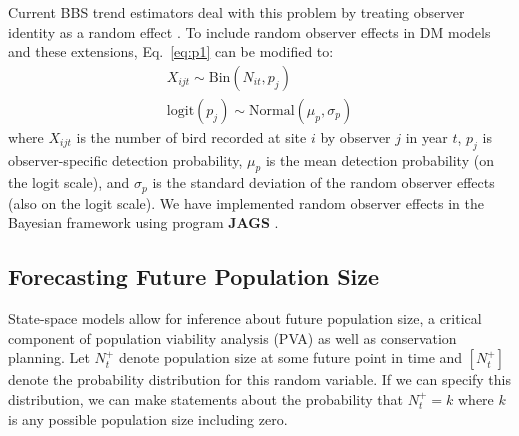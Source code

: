 \documentclass[12pt]{article}
\begin{document}
Current BBS trend estimators deal with this problem by
treating observer identity as a random %
effect \citep{link_sauer:2002,sauer_link:2011}.
%
To include random observer effects in DM models and these
extensions, Eq.~\ref{eq:p1} can be modified to:
\begin{gather}
X_{ijt} \sim \mathrm{Bin}(N_{it}, p_j) \nonumber \\
\mathrm{logit}(p_j) \sim \mathrm{Normal}(\mu_p, \sigma_p)
\label{eq:pobs}
\end{gather}
where $X_{ijt}$ is the number of bird recorded at site $i$ by
observer $j$ in year $t$, $p_j$ is observer-specific detection probability,
$\mu_p$ is the mean detection probability (on the logit scale), and $\sigma_p$ is
the standard deviation of the random observer effects (also on the logit scale). 
We have implemented random observer effects in the Bayesian
framework using program \textbf{JAGS} \citep[version 3.2.0, see Appendix]{plummer:2003}.



\subsection{Forecasting Future Population Size}

State-space models allow for inference about future population size,
a critical component of population viability analysis (PVA) as well
as conservation planning. Let $N^+_{t}$ denote population size at some
future point in time and $[N^+_t]$ denote the probability
distribution for this random variable. If we can specify this
distribution, we can make statements about the
probability that $N^+_t = k$ where $k$ is any possible
population size including zero.
\end{document}
